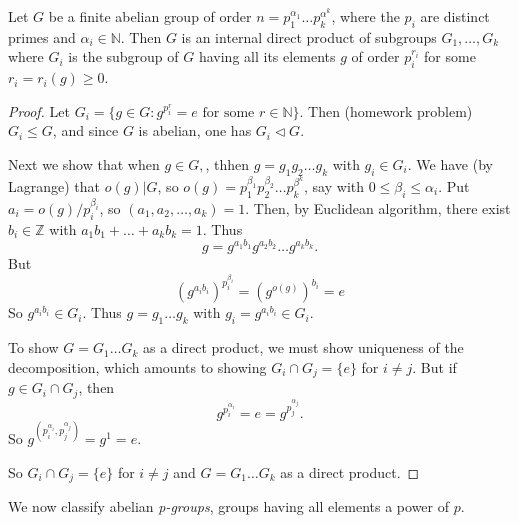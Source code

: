 
\begin{lemma}
	Let $G$ be a finite abelian group of order $n = p_1^{\alpha_1}\ldots p_k^{\alpha^k}$,  where the $p_i$ are distinct primes and $\alpha _i \in \mathbb{N}$. Then $G$ is an internal direct product of subgroups $G_1, \ldots, G_k$ where $G_i$ is the subgroup of $G$ having all its elements $g$ of order $p_i^{r_i}$ for some $r_i = r_i(g) \ge 0$.
\end{lemma}
\begin{proof}
	Let $G_i = \{g \in G: g^{p_i^r} = e \text{ for some }r \in \mathbb{N}\}$. Then (homework problem) $G_i \le G$, and since $G$ is abelian, one has $G_i \triangleleft G$.

	Next we show that when $g \in G,$, thhen $g = g_1g_2\ldots g_k$ with $g_i \in G_i$. We have (by Lagrange) that $o(g) | G$, so $o(g) = p_1^{\beta_1}p_2^{\beta_2}\ldots p_k ^{\beta^k}$, say with $0\le \beta_i \le \alpha_i$. Put $a_i = o(g) / p_i ^{\beta_i}$, so $(a_1, a_2, \ldots, a_k) = 1$. Then, by Euclidean algorithm, there exist $b_i \in \mathbb{Z}$ with $a_1b_1 + \ldots + a_k b_k = 1$. Thus
	\[
		g = g^{a_1b_1} g^{a_2b_2}\ldots g^{a_kb_k}
	.\] 
	But
	\[
		\left( g^{a_ib_i} \right) ^{p_i^{\beta_i}}
		= (g^{o(g)})^{b_i} = e
	\]
	So $g^{a_i b_i} \in G_i$. Thus $g = g_1 \ldots g_k$ with $g_i = g^{a_i b_i} \in G_i$.

	To show $G = G_1 \ldots G_k$ as a direct product, we must show uniqueness of the decomposition, which amounts to showing $G_i \cap G_j = \{e\} $ for $i \neq j$. But if $g \in G_i \cap G_j$, then \[
		g^{p_i^{\alpha_i}} = e = g^{p_j^{\alpha_j}}
	.\] 
	So $g^{(p_i^{\alpha_i}, p_j^{\alpha_j})} = g^1 = e$.

	So  $G_i \cap G_j = \{e\} $ for $i \neq j$ and $G = G_1 \ldots G_k$ as a direct product.
\end{proof}

We now classify abelian \textit{p-groups}, groups having all elements a power of $p$.

